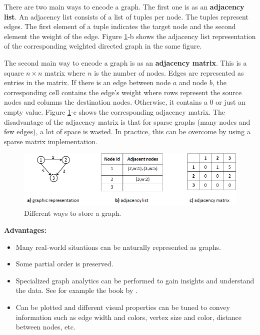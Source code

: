 \documentclass[
  11pt,
]{krantz}
\providecommand{\tightlist}{%
  \setlength{\itemsep}{0pt}\setlength{\parskip}{0pt}}
\begin{document}
There are two main ways to encode a graph. The first one is as an \textbf{adjacency list}. An adjacency list consists of a list of tuples per node. The tuples represent edges. The first element of a tuple indicates the target node and the second element the weight of the edge. Figure \ref{fig:graphOptions}-b shows the adjacency list representation of the corresponding weighted directed graph in the same figure.

The second main way to encode a graph is as an \textbf{adjacency matrix}. This is a square \(n\times n\) matrix where \(n\) is the number of nodes. Edges are represented as entries in the matrix. If there is an edge between node \(a\) and node \(b\), the corresponding cell contains the edge's weight where rows represent the source nodes and columns the destination nodes. Otherwise, it contains a \(0\) or just an empty value. Figure \ref{fig:graphOptions}-c shows the corresponding adjacency matrix. The disadvantage of the adjacency matrix is that for sparse graphs (many nodes and few edges), a lot of space is wasted. In practice, this can be overcome by using a sparse matrix implementation.

\begin{figure}

{\centering \includegraphics[width=0.9\linewidth]{images/graph_options} 

}

\caption{Different ways to store a graph.}\label{fig:graphOptions}
\end{figure}

\textbf{Advantages:}

\begin{itemize}
\tightlist
\item
  Many real-world situations can be naturally represented as graphs.
\item
  Some partial order is preserved.
\item
  Specialized graph analytics can be performed to gain insights and understand the data. See for example the book by \citet{samatova2013}.
\item
  Can be plotted and different visual properties can be tuned to convey information such as edge width and colors, vertex size and color, distance between nodes, etc.
\end{itemize}
\end{document}
